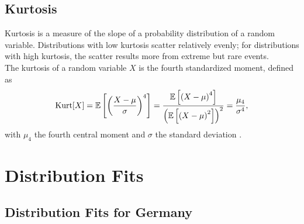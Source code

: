 \subsection{Kurtosis}
Kurtosis is a measure of the slope of a probability distribution of a random variable. Distributions with low kurtosis scatter relatively evenly; for distributions with high kurtosis, the scatter results more from extreme but rare events. \\
The kurtosis of a random variable $X$ is the fourth standardized moment, defined as
\begin{equation}\label{eq:kurtosis}
    \hbox{Kurt}[X]=\mathbb{E}\left[\left(\frac{X-\mu}{\sigma}\right)^4\right] = \frac{\mathbb{E}\left[\left(X-\mu\right)^4\right]}{\left(\mathbb{E}\left[\left(X-\mu\right)^2\right]\right)^2}=\frac{\mu_4}{\sigma^4},
\end{equation}
with $\mu_4$ the fourth central moment and $\sigma$ the standard deviation \autocite[][]{decarlo1997meaning, wilkins1944note}.
\clearpage
\section{Distribution Fits}
\subsection{Distribution Fits for Germany}
